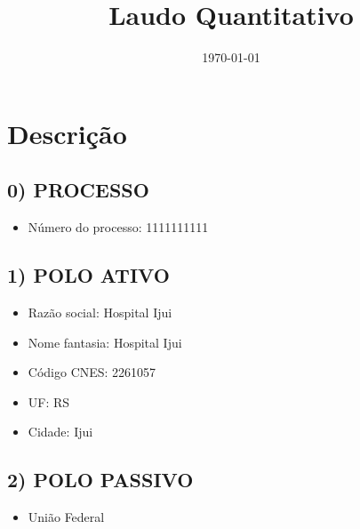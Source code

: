 \documentclass{report}
\title{Laudo Quantitativo}
\author{}
\date{\today}
\begin{document}
\maketitle
    
\section{Descrição}
\subsection{0) PROCESSO}
\begin{itemize}
	\item{Número do processo: 1111111111} 
\end{itemize}


\subsection{1) POLO ATIVO}
\begin{itemize}
	\item{Razão social: Hospital Ijui} 
	\item{Nome fantasia: Hospital Ijui}
	\item{Código CNES: 2261057}
	\item{UF: RS} 
	\item{Cidade: Ijui} 
\end{itemize}


\subsection{2) POLO PASSIVO}
\begin{itemize}
	\item{União Federal}
\end{itemize}
\end{document}
